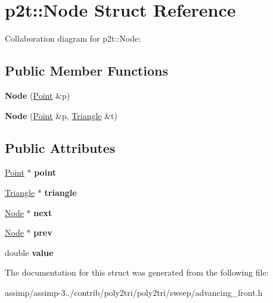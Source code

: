 \hypertarget{structp2t_1_1_node}{\section{p2t\+:\+:Node Struct Reference}
\label{structp2t_1_1_node}
}


Collaboration diagram for p2t\+:\+:Node\+:
\subsection*{Public Member Functions}
\begin{DoxyCompactItemize}
\item 
\hypertarget{structp2t_1_1_node_a552fce8408e77734916d24f49a2554ee}{{\bfseries Node} (\hyperlink{structp2t_1_1_point}{Point} \&p)}\label{structp2t_1_1_node_a552fce8408e77734916d24f49a2554ee}

\item 
\hypertarget{structp2t_1_1_node_ae8a123fb34395a84c2c3909240650119}{{\bfseries Node} (\hyperlink{structp2t_1_1_point}{Point} \&p, \hyperlink{classp2t_1_1_triangle}{Triangle} \&t)}\label{structp2t_1_1_node_ae8a123fb34395a84c2c3909240650119}

\end{DoxyCompactItemize}
\subsection*{Public Attributes}
\begin{DoxyCompactItemize}
\item 
\hypertarget{structp2t_1_1_node_a1b991bf50dfcbc2bf3965e4a9d20c6b7}{\hyperlink{structp2t_1_1_point}{Point} $\ast$ {\bfseries point}}\label{structp2t_1_1_node_a1b991bf50dfcbc2bf3965e4a9d20c6b7}

\item 
\hypertarget{structp2t_1_1_node_a272db6142d5d20b8f5157a084cae6a5b}{\hyperlink{classp2t_1_1_triangle}{Triangle} $\ast$ {\bfseries triangle}}\label{structp2t_1_1_node_a272db6142d5d20b8f5157a084cae6a5b}

\item 
\hypertarget{structp2t_1_1_node_a4ed6924b245e577926ddcf9471333468}{\hyperlink{structp2t_1_1_node}{Node} $\ast$ {\bfseries next}}\label{structp2t_1_1_node_a4ed6924b245e577926ddcf9471333468}

\item 
\hypertarget{structp2t_1_1_node_a2b0cd5c3882bb383a5180472d81cb39c}{\hyperlink{structp2t_1_1_node}{Node} $\ast$ {\bfseries prev}}\label{structp2t_1_1_node_a2b0cd5c3882bb383a5180472d81cb39c}

\item 
\hypertarget{structp2t_1_1_node_adcf1fe932052b232ec31204eccef031a}{double {\bfseries value}}\label{structp2t_1_1_node_adcf1fe932052b232ec31204eccef031a}

\end{DoxyCompactItemize}


The documentation for this struct was generated from the following file\+:\begin{DoxyCompactItemize}
\item 
assimp/assimp-\/3../contrib/poly2tri/poly2tri/sweep/advancing\+\_\+front.\+h\end{DoxyCompactItemize}
